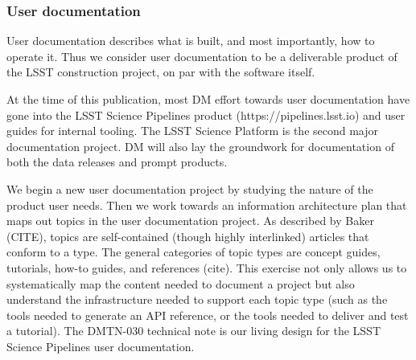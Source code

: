 \subsubsection{User documentation}

User documentation describes what is built, and most importantly, how to operate it.
Thus we consider user documentation to be a deliverable product of the LSST construction project, on par with the software itself.

At the time of this publication, most DM effort towards user documentation have gone into the LSST Science Pipelines product (https://pipelines.lsst.io) and user guides for internal tooling.
The LSST Science Platform is the second major documentation project.
DM will also lay the groundwork for documentation of both the data releases and prompt products.

We begin a new user documentation project by studying the nature of the product user needs.
Then we work towards an information architecture plan that maps out topics in the user documentation project.
As described by Baker (CITE), topics are self-contained (though highly interlinked) articles that conform to a type.
The general categories of topic types are concept guides, tutorials, how-to guides, and references (cite).
This exercise not only allows us to systematically map the content needed to document a project but also understand the infrastructure needed to support each topic type (such as the tools needed to generate an API reference, or the tools needed to deliver and test a tutorial).
The DMTN-030 technical note is our living design for the LSST Science Pipelines user documentation.
